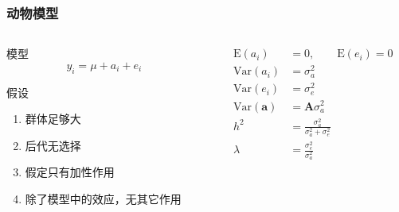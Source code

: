 \documentclass[serif,aspectratio=169]{beamer}
\begin{document}
\begin{frame}
  \frametitle{动物模型}
  \begin{columns}
    \begin{column}{.5\textwidth}
      \begin{block}{模型}
        $$y_i = \mu+a_i+e_i$$
      \end{block}
      \begin{block}{假设}
        \begin{enumerate}
        \item 群体足够大
        \item 后代无选择
        \item 假定只有加性作用
        \item 除了模型中的效应，无其它作用
        \end{enumerate}
      \end{block}
    \end{column}
    
    \begin{column}{.5\textwidth}
      \begin{align*}
        \mathrm{E}(a_i) &= 0,\qquad \mathrm{E}(e_i)=0\\
        \mathrm{Var}(a_i) &=\sigma_a^2\\
        \mathrm{Var}(e_i) &=\sigma_e^2\\
        \mathrm{Var}(\mathbf{a}) &= \mathbf{A}\sigma_a^2\\
        h^2 &=\frac{\sigma_a^2}{\sigma_a^2+\sigma_e^2}\\
        \lambda &=\frac{\sigma_e^2}{\sigma_a^2}
      \end{align*}
    \end{column}
  \end{columns}
\end{frame}
\end{document}
